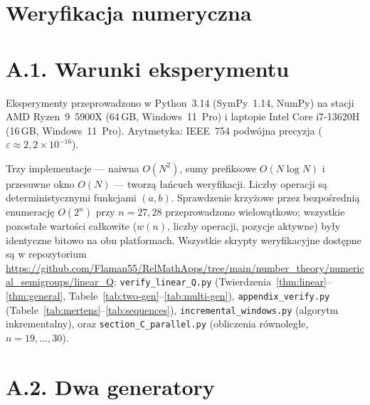 \appendix
\section{Weryfikacja numeryczna}
\label{sec:verification}


\section*{A.1. Warunki eksperymentu}
\label{subsec:a1-warunki}

Eksperymenty przeprowadzono w Python~3.14 (SymPy~1.14, NumPy)
na stacji AMD Ryzen~9~5900X (64\,GB, Windows~11~Pro)
i laptopie Intel Core i7-13620H (16\,GB, Windows~11~Pro).
Arytmetyka: IEEE~754 podwójna precyzja ($\varepsilon \approx 2{,}2 \times 10^{-16}$).

Trzy implementacje --- naiwna $O(N^2)$, sumy prefiksowe $O(N\log N)$
i przesuwne okno $O(N)$ --- tworzą łańcuch weryfikacji.
Liczby operacji są deterministycznymi funkcjami $(a, b)$.
Sprawdzenie krzyżowe przez bezpośrednią enumerację $O(2^n)$
przy $n = 27, 28$ przeprowadzono wielowątkowo;
wszystkie pozostałe wartości całkowite
($w(n)$, liczby operacji, pozycje aktywne)
były identyczne bitowo na obu platformach.
Wszystkie skrypty weryfikacyjne dostępne są w repozytorium
\url{https://github.com/Flaman55/RelMathApps/tree/main/number_theory/numerical_semigroups/linear_Q}:
\texttt{verify\_linear\_Q.py} (Twierdzenia~\ref{thm:linear}--\ref{thm:general},
Tabele~\ref{tab:two-gen}--\ref{tab:multi-gen}),
\texttt{appendix\_verify.py} (Tabele~\ref{tab:mertens}--\ref{tab:sequences}),
\texttt{incremental\_windows.py} (algorytm inkrementalny),
oraz \texttt{section\_C\_parallel.py} (obliczenia równoległe, $n=19,\ldots,30$).


\section*{A.2. Dwa generatory}
\label{subsec:a2-dwa}

